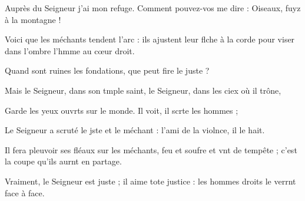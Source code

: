 \item Auprès du Seigneur j’ai mon refuge.\pscross{} Comment pouvez-vos me dire :\psstar{} Oiseaux, fuyz à la montagne !
\item Voici que les méchants tendent l’arc :\pscross{} ils ajustent leur flche à la corde\psstar{} pour viser dans l’ombre l’hmme au cœur droit.
\item Quand sont ruines les fondations,\psstar{} que peut fire le juste ?
\item Mais le Seigneur, dans son tmple saint,\psstar{} le Seigneur, dans les ciex où il trône,
\item Garde les yeux ouvrts sur le monde.\psstar{} Il voit, il scrte les hommes ;
\item Le Seigneur a scruté le jste et le méchant :\psstar{} l’ami de la violnce, il le hait.
\item Il fera pleuvoir ses fléaux sur les méchants,\pscross{} feu et soufre et vnt de tempête ;\psstar{} c’est la coupe qu’ils aurnt en partage.
\item Vraiment, le Seigneur est juste ;\pscross{} il aime tote justice :\psstar{} les hommes droits le verrnt face à face.